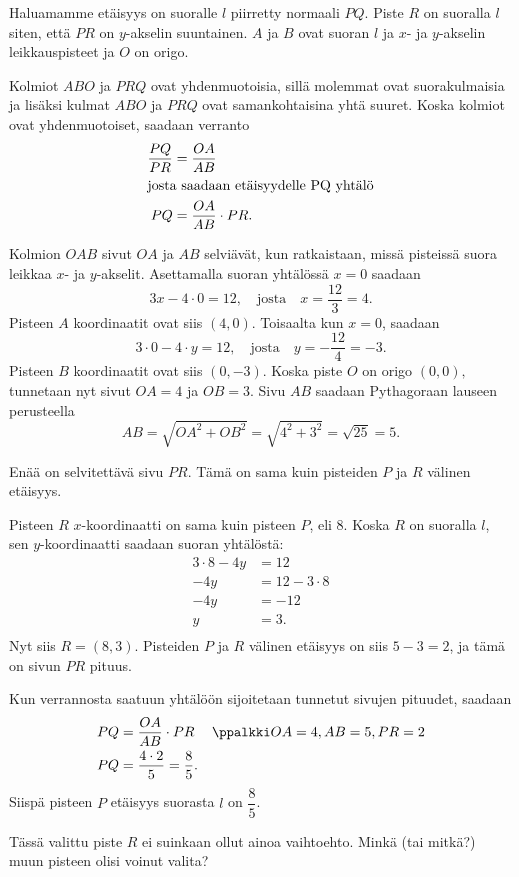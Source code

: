 Haluamamme etäisyys on suoralle $l$ piirretty normaali $PQ$. Piste $R$ on suoralla $l$ siten, että $PR$ on $y$-akselin suuntainen. $A$ ja $B$ ovat suoran $l$ ja $x$- ja $y$-akselin leikkauspisteet ja $O$ on origo.

Kolmiot $ABO$ ja $PRQ$ ovat yhdenmuotoisia, sillä molemmat ovat suorakulmaisia ja lisäksi kulmat $ABO$ ja $PRQ$ ovat samankohtaisina yhtä suuret. Koska kolmiot ovat yhdenmuotoiset, saadaan verranto
\begin{align*}
\frac{PQ}{PR} &=\frac{OA}{AB}\\
\intertext{josta saadaan etäisyydelle PQ yhtälö}
PQ &=\frac{OA}{AB}\cdot PR.
\end{align*}

Kolmion $OAB$ sivut $OA$ ja $AB$ selviävät, kun ratkaistaan, missä pisteissä suora leikkaa $x$- ja $y$-akselit.
Asettamalla suoran yhtälössä $x=0$ saadaan
\[
3x-4\cdot 0=12, \quad \text{josta} \quad x=\frac{12}{3}=4.
\]
Pisteen $A$ koordinaatit ovat siis $(4, 0)$. Toisaalta kun $x=0$, saadaan
\[
3\cdot 0-4\cdot y=12, \quad \text{josta} \quad y=-\frac{12}{4}=-3.
\]
Pisteen $B$ koordinaatit ovat siis $(0, -3)$. Koska piste $O$ on origo $(0,0),$ tunnetaan nyt sivut $OA=4$ ja $OB=3$. Sivu $AB$ saadaan Pythagoraan lauseen perusteella
\[
AB=\sqrt{OA^2+OB^2}=\sqrt{4^2+3^2}=\sqrt{25}=5.
\]

Enää on selvitettävä sivu $PR$. Tämä on sama kuin pisteiden $P$ ja $R$ välinen etäisyys.

Pisteen $R$ $x$-koordinaatti on sama kuin pisteen $P$, eli 8. Koska $R$ on suoralla $l$, sen $y$-koordinaatti saadaan suoran yhtälöstä:
\begin{align*}
3\cdot 8-4y & =12 \\
-4y & =12-3\cdot 8 \\
-4y & =-12 \\
y & =3. \\
\end{align*}
Nyt siis $R=(8, 3)$. Pisteiden $P$ ja $R$ välinen etäisyys on siis $5-3=2$, ja tämä on sivun $PR$ pituus.

Kun verrannosta saatuun yhtälöön sijoitetaan tunnetut sivujen pituudet, saadaan
\begin{align*}
PQ &=\frac{OA}{AB}\cdot PR  && \ppalkki OA= 4, AB=5, PR= 2\\
PQ & =\frac{4\cdot 2}{5} = \frac{8}{5}.
\end{align*}
Siispä pisteen $P$ etäisyys suorasta $l$ on $\dfrac{8}{5}$.

Tässä valittu piste $R$ ei suinkaan ollut ainoa vaihtoehto. Minkä (tai mitkä?) muun pisteen olisi voinut valita?

